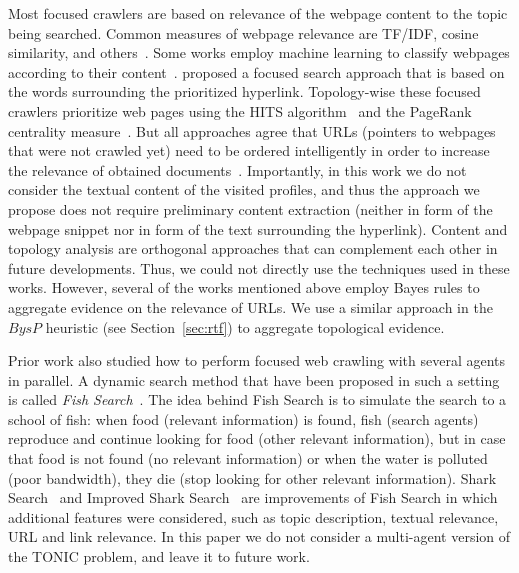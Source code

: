 \documentclass[prodmode,acmtecs]{acmsmall} %
\begin{document}
Most focused crawlers are based on relevance of the webpage content to the topic being searched. Common measures of webpage relevance are TF/IDF, cosine similarity, and others~\cite{diligenti2000focused,menczer2001evaluating}. 
Some works employ machine learning to classify webpages according to their content~\cite{chakrabarti1999focused}. 
 proposed a focused search approach that is based on the words surrounding the prioritized hyperlink.  
Topology-wise these focused crawlers prioritize web pages using the HITS algorithm~\cite{kleinberg1999authoritative} and the PageRank centrality measure~\cite{almpanidis2007combining}. 
But all approaches agree that URLs (pointers to webpages that were not crawled yet) need to be ordered intelligently in order to increase the relevance of obtained documents~\cite{cho1998efficient}. Importantly, in this work we do not consider the textual content of the visited profiles, and thus the approach we propose does not require preliminary content extraction (neither in form of the webpage snippet nor in form of the text surrounding the hyperlink). 
Content and topology analysis are orthogonal approaches that can complement each other in future developments. Thus, we could not directly use the techniques used in these works. However, several of the works mentioned above employ Bayes rules to aggregate evidence on the relevance of URLs. We use a similar approach in the \(BysP\) heuristic (see Section~\ref{sec:rtf}) to aggregate topological evidence. 


Prior work also studied how to perform focused web crawling with several agents in parallel. A dynamic search method that have been proposed in such a setting is called {\em Fish Search}~\cite{de1994searching}. The idea behind Fish Search is to simulate the search to a school of fish: when food (relevant information) is found, fish (search agents) reproduce and continue looking for food (other relevant information), but in case that food is not found (no relevant information) or when the water is polluted (poor bandwidth), they die (stop looking for other relevant information). Shark Search~\cite{hersovici1998shark} and Improved Shark Search~\cite{chen2007improved} are improvements of Fish Search in which additional features were considered, such as topic description, textual relevance, URL and link relevance. 
In this paper we do not consider a multi-agent version of the TONIC problem, and leave it to future work. 
\end{document}
